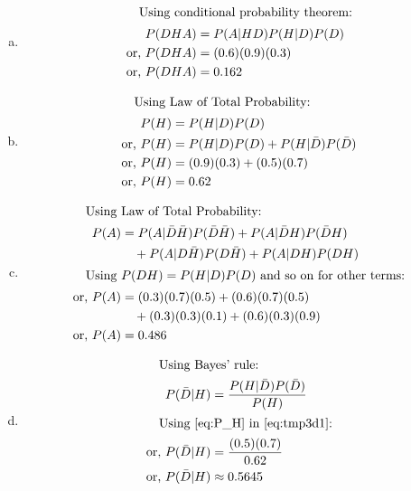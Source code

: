 \begin{enumerate}[a.]
	\item
		\begin{align}
			\intertext{\quad Using conditional probability theorem:}
			P(DHA) &= P(A|HD)P(H|D)P(D) \nonumber\\
			\text{or, } P(DHA) &= (0.6)(0.9)(0.3) \nonumber\\
			\text{or, } P(DHA) &= 0.162 \label{eq:P_DHA}
		\end{align}
	\item
		\begin{align}
			\intertext{\quad Using Law of Total Probability:}
			P(H) &= P(H|D)P(D) \nonumber\\
			\text{or, } P(H) &= P(H|D)P(D) + P(H|\bar{D})P(\bar{D}) \nonumber\\
			\text{or, } P(H) &= (0.9)(0.3) + (0.5)(0.7) \nonumber\\
			\text{or, } P(H) &= 0.62 \label{eq:P_H}
		\end{align}
	\item
		\begin{align}
			\intertext{\quad Using Law of Total Probability:}
			P(A) &= P(A|\bar{D}\bar{H})P(\bar{D}\bar{H}) + P(A|\bar{D}H)P(\bar{D}H) \nonumber\\
			{} &\quad+ P(A|D\bar{H})P(D\bar{H}) + P(A|DH)P(DH) \nonumber\\
			\intertext{\quad Using  $P(DH) = P(H|D)P(D)$ and so on for other terms:}
			\text{or, } P(A) &= (0.3)(0.7)(0.5) + (0.6)(0.7)(0.5) \nonumber\\
			{} &\quad+ (0.3)(0.3)(0.1) + (0.6)(0.3)(0.9) \nonumber\\
			\text{or, } P(A) &= 0.486 \label{eq:P_A}	
		\end{align}
	\item
		\begin{align}
			\intertext{\quad Using Bayes' rule:}
			P(\bar{D}|H) &= \frac{P(H|\bar{D})P(\bar{D})}{P(H)} \label{eq:tmp3d1}\\
			\intertext{\quad Using \cref{eq:P_H} in \cref{eq:tmp3d1}:}
			\orr P(\bar{D}|H) &= \frac{(0.5)(0.7)}{0.62} \nonumber\\
			\orr P(\bar{D}|H) &\approx 0.5645 \label{eq:P_NOTD|H}
		\end{align}
\end{enumerate}